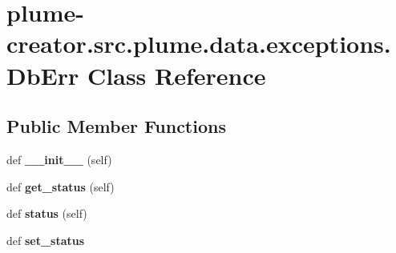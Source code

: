 \hypertarget{classplume-creator_1_1src_1_1plume_1_1data_1_1exceptions_1_1_db_err}{}\section{plume-\/creator.src.\+plume.\+data.\+exceptions.\+Db\+Err Class Reference}
\label{classplume-creator_1_1src_1_1plume_1_1data_1_1exceptions_1_1_db_err}
\subsection*{Public Member Functions}
\begin{DoxyCompactItemize}
\item 
def {\bfseries \+\_\+\+\_\+init\+\_\+\+\_\+} (self)\hypertarget{classplume-creator_1_1src_1_1plume_1_1data_1_1exceptions_1_1_db_err_a7843b1ccdd906a4a7121c641dc87a82f}{}\label{classplume-creator_1_1src_1_1plume_1_1data_1_1exceptions_1_1_db_err_a7843b1ccdd906a4a7121c641dc87a82f}

\item 
def {\bfseries get\+\_\+status} (self)\hypertarget{classplume-creator_1_1src_1_1plume_1_1data_1_1exceptions_1_1_db_err_a02ca94bb9716e8ec3857372e5b736d55}{}\label{classplume-creator_1_1src_1_1plume_1_1data_1_1exceptions_1_1_db_err_a02ca94bb9716e8ec3857372e5b736d55}

\item 
def {\bfseries status} (self)\hypertarget{classplume-creator_1_1src_1_1plume_1_1data_1_1exceptions_1_1_db_err_a060b71fd577d81feb77009ca3e243e05}{}\label{classplume-creator_1_1src_1_1plume_1_1data_1_1exceptions_1_1_db_err_a060b71fd577d81feb77009ca3e243e05}

\item 
def {\bfseries set\+\_\+status}\hypertarget{classplume-creator_1_1src_1_1plume_1_1data_1_1exceptions_1_1_db_err_a05a6b1867b52d57a16bee18292854599}{}\label{classplume-creator_1_1src_1_1plume_1_1data_1_1exceptions_1_1_db_err_a05a6b1867b52d57a16bee18292854599}

\end{DoxyCompactItemize}
